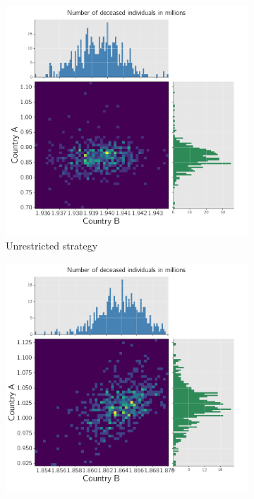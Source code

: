 \begin{figure}[h!]
     \centering
     \begin{subfigure}[b]{0.49\textwidth}
         \centering
         \includegraphics[width=\textwidth]{images/piecewise_stochastic_histogram_deceased_unrestricted.png}
         \caption{Unrestricted strategy}
         \label{fig:2d_unrestricted_piecewise}
     \end{subfigure}
     \hfill
     \begin{subfigure}[b]{0.49\textwidth}
         \centering
         \includegraphics[width=\textwidth]{images/piecewise_stochastic_histogram_deceased_optimal.png}

\end{subfigure}
\end{figure}
